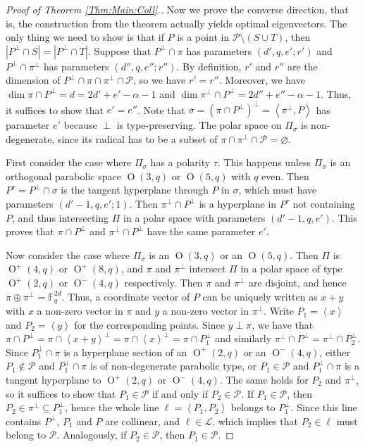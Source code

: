 \documentclass[a4paper]{article}
\theoremstyle{definition}
\newcommand{\FF}{\mathbb F}
\newcommand{\vspan}[1]{\left\langle #1 \right\rangle}
\newcommand{\ml}{\mathcal L}
\renewcommand{\mp}{\mathcal P}
\DeclareMathOperator{\OO}{O}
\begin{document}
\begin{proof}[Proof of Theorem \ref{Thm:Main:Coll}.]
\bigskip

Now we prove the converse direction, that is, the construction from the theorem actually yields optimal eigenvectors.
The only thing we need to show is that if $P$ is a point in $\mp \setminus (S \cup T)$, then $|P^\perp \cap S| = |P^\perp \cap T|$.
Suppose that $P^\perp \cap \pi$ has parameters $(d',q,e';r')$ and $P^\perp \cap \pi^\perp$ has parameters $(d'',q,e'';r'')$.
By definition, $r'$ and $r''$ are the dimension of $P^\perp \cap \pi \cap \pi^\perp \cap \mp$, so we have $r'=r''$.
Moreover, we have $\dim \pi \cap P^\perp = d = 2d'+e'-\alpha-1$ and $\dim \pi^\perp \cap P^\perp = 2d''+e''-\alpha-1$.
Thus, it suffices to show that $e'=e''$.
Note that $\sigma = (\pi \cap P^\perp)^\perp = \vspan{\pi^\perp,P}$ has parameter $e'$ because $\perp$ is type-preserving.
The polar space on $\Pi_\sigma$ is non-degenerate, since its radical has to be a subset of $\pi \cap \pi^\perp \cap \mp = \varnothing$.

First consider the case where $\Pi_\sigma$ has a polarity $\tau$.
This happens unless $\Pi_\sigma$ is an orthogonal parabolic space $\OO(3,q)$ or $\OO(5,q)$ with $q$ even.
Then $P^\tau = P^\perp \cap \sigma$ is the tangent hyperplane through $P$ in $\sigma$, which must have parameters $(d'-1,q,e';1)$.
Then $\pi^\perp \cap P^\perp$ is a hyperplane in $P^\tau$ not containing $P$, and thus intersecting $\Pi$ in a polar space with parameters $(d'-1,q,e')$.
This proves that $\pi \cap P^\perp$ and $\pi^\perp \cap P^\perp$ have the same parameter $e'$.

Now consider the case where $\Pi_\sigma$ is an $\OO(3,q)$ or an $\OO(5,q)$.
Then $\Pi$ is $\OO^+(4,q)$ or $\OO^+(8,q)$, and $\pi$ and $\pi^\perp$ intersect $\Pi$ in a polar space of type $\OO^+(2,q)$ or $\OO^-(4,q)$ respectively.
Then $\pi$ and $\pi^\perp$ are disjoint, and hence $\pi \oplus \pi^\perp = \FF_q^{2d}$.
Thus, a coordinate vector of $P$ can be uniquely written as $x+y$ with $x$ a non-zero vector in $\pi$ and $y$ a non-zero vector in $\pi^\perp$.
Write $P_1 = \vspan x$ and $P_2 = \vspan y$ for the corresponding points.
Since $y \perp \pi$, we have that $\pi \cap P^\perp = \pi \cap \vspan{x+y}^\perp = \pi \cap \vspan{x}^\perp = \pi \cap P_1^\perp$ and similarly $\pi^\perp \cap P^\perp = \pi^\perp \cap P_2^\perp$.
Since $P_1^\perp \cap \pi$ is a hyperplane section of an $\OO^+(2,q)$ or an $\OO^-(4,q)$, either $P_1 \notin \mp$ and $P_1^\perp \cap \pi$ is of non-degenerate parabolic type, or $P_1 \in \mp$ and $P_1^\perp \cap \pi$ is a tangent hyperplane to $\OO^+(2,q)$ or $\OO^-(4,q)$.
The same holds for $P_2$ and $\pi^\perp$, so it suffices to show that $P_1 \in \mp$ if and only if $P_2 \in \mp$.
If $P_1 \in \mp$, then $P_2 \in \pi^\perp \subseteq P_1^\perp$, hence the whole line $\ell = \vspan{P_1,P_2}$ belongs to $P_1^\perp$.
Since this line contains $P^\perp$, $P_1$ and $P$ are collinear, and $\ell \in \ml$, which implies that $P_2 \in \ell$ must belong to $\mp$.
Analogously, if $P_2 \in \mp$, then $P_1 \in \mp$.
\end{proof}
\end{document}

